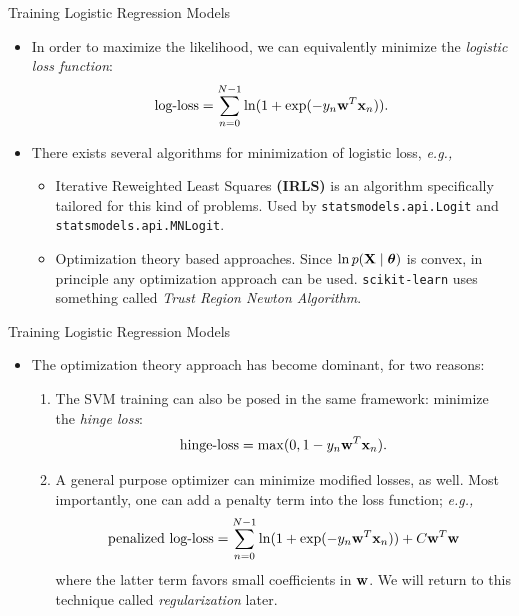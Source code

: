 \documentclass[10pt, aspectratio=169]{beamer} %
\newcommand{\thb}{\boldsymbol{\theta}}
\newcommand{\w}{{\bf w}}
\newcommand{\X}{{\bf X}}
\newcommand{\x}{{\bf x}}
\begin{document}
\begin{frame}[allowframebreaks]{Training Logistic Regression Models}
\begin{itemize}
\item In order to maximize the likelihood, we can equivalently minimize the 
\emph{logistic loss function}:
\[
\text{log-loss} = \sum_{n = 0}^{N-1} \ln(1 + \exp(-y_n\w^T\x_n)).
\]
\item There exists several algorithms for minimization of logistic loss, \emph{e.g.,}
\begin{itemize}
	\item Iterative Reweighted Least Squares \textbf{(IRLS)} is an algorithm specifically tailored for this kind of problems. Used by \texttt{statsmodels.api.Logit} and \texttt{statsmodels.api.MNLogit}.
	\item Optimization theory based approaches. Since $\ln p(\X \mid \thb)$ is convex, in principle any optimization approach can be used. 
	\texttt{scikit-learn} uses something called \emph{Trust Region Newton Algorithm}.
\end{itemize}
\end{itemize}
\end{frame}

\begin{frame}[allowframebreaks]{Training Logistic Regression Models}
\begin{itemize}
\item The optimization theory approach has become dominant, for two reasons:
\begin{enumerate}
	\item The SVM training can also be posed in the same framework: minimize the \emph{hinge loss}:
	\[
	\text{hinge-loss} = \max(0, 1-y_n\w^T\x_n).
	\]
	\item A general purpose optimizer can minimize modified losses, as well. Most importantly,
	one can add a penalty term into the loss function; \emph{e.g.,}
	\[
	\text{penalized log-loss} = \sum_{n = 0}^{N-1} \ln(1 + \exp(-y_n\w^T\x_n)) + C \w^T\w
	\]
	where the latter term favors small coefficients in $\w$. We will return to this
	technique called \emph{regularization} later.
\end{enumerate}
\end{itemize}
\end{frame}
\end{document}
